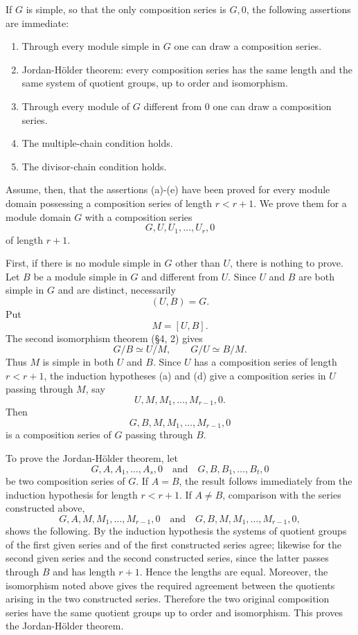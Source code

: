 \documentclass[11pt]{article}
\begin{document}
If \(G\) is simple, so that the only composition series is \(G,0\), the
following assertions are immediate:

\begin{enumerate}
\def\labelenumi{(\alph{enumi})}
\item
  Through every module simple in \(G\) one can draw a composition
  series.
\item
  Jordan-Hölder theorem: every composition series has the same length
  and the same system of quotient groups, up to order and isomorphism.
\item
  Through every module of \(G\) different from \(0\) one can draw a
  composition series.
\item
  The multiple-chain condition holds.
\item
  The divisor-chain condition holds.
\end{enumerate}

Assume, then, that the assertions (a)-(e) have been proved for every
module domain possessing a composition series of length \(r<r+1\). We
prove them for a module domain \(G\) with a composition series \[
  G,U,U_1,
\ldots,U_r,0
\] of length \(r+1\).

First, if there is no module simple in \(G\) other than \(U\), there is
nothing to prove. Let \(B\) be a module simple in \(G\) and different
from \(U\). Since \(U\) and \(B\) are both simple in \(G\) and are
distinct, necessarily \[
  (U,B)=G.
\] Put \[
  M=[U,B].
\] The second isomorphism theorem (§4, 2) gives \[
  G/B \simeq U/M,
  \qquad
  G/U \simeq B/M.
\] Thus \(M\) is simple in both \(U\) and \(B\). Since \(U\) has a
composition series of length \(r<r+1\), the induction hypotheses (a) and
(d) give a composition series in \(U\) passing through \(M\), say \[
  U,M,M_1,
\ldots,M_{r-1},0.
\] Then \[
  G,B,M,M_1,
\ldots,M_{r-1},0
\] is a composition series of \(G\) passing through \(B\).

To prove the Jordan-Hölder theorem, let \[
  G,A,A_1,
\ldots,A_s,0
  \quad\text{and}\quad
  G,B,B_1,
\ldots,B_t,0
\] be two composition series of \(G\). If \(A=B\), the result follows
immediately from the induction hypothesis for length \(r<r+1\). If
\(A\ne B\), comparison with the series constructed above, \[
  G,A,M,M_1,
\ldots,M_{r-1},0
  \quad\text{and}\quad
  G,B,M,M_1,
\ldots,M_{r-1},0,
\] shows the following. By the induction hypothesis the systems of
quotient groups of the first given series and of the first constructed
series agree; likewise for the second given series and the second
constructed series, since the latter passes through \(B\) and has length
\(r+1\). Hence the lengths are equal. Moreover, the isomorphism noted
above gives the required agreement between the quotients arising in the
two constructed series. Therefore the two original composition series
have the same quotient groups up to order and isomorphism. This proves
the Jordan-Hölder theorem.
\end{document}
